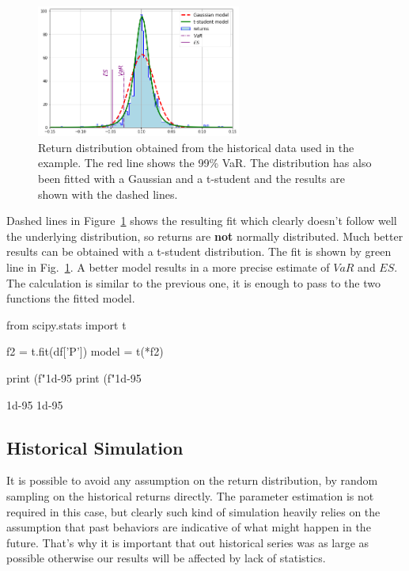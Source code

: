 \begin{figure}[htb]
\centering
\includegraphics[width=0.6\textwidth]{figures/parametric_var}
\caption{Return distribution obtained from the historical data used in the example. The red line shows the 99\% VaR. The distribution has also been fitted with a Gaussian and a t-student and the results are shown with the dashed lines.}
\label{fig:paramtric_var}
\end{figure}

Dashed lines in Figure~\ref{fig:paramtric_var} shows the resulting fit which clearly doesn't follow well the underlying distribution, so returns are \textbf{not} normally distributed. Much better results can be obtained with a t-student distribution. The fit is shown by green line in Fig.~\ref{fig:paramtric_var}. A better model results in a more precise estimate of $VaR$ and $ES$. The calculation is similar to the previous one, it is enough to pass to the two functions the fitted model.

\begin{ipython}
from scipy.stats import t

f2 = t.fit(df['P'])
model = t(*f2)

print (f"1d-95%
print (f"1d-95%
\end{ipython}
\begin{ioutput}
1d-95%
1d-95%
\end{ioutput}

\subsection{Historical Simulation}
\label{historical-simulation}

It is possible to avoid any assumption on the return distribution, by random sampling on the historical returns directly. The parameter estimation is not required in this case, but clearly such kind of simulation heavily relies on the assumption that past behaviors are indicative of what might happen in the future. That's why it is important that out historical series was as large as possible otherwise our results will be affected by lack of statistics. 

